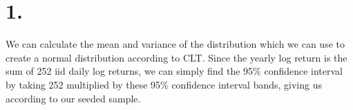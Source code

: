 \documentclass{article}
\begin{document}
\thispagestyle{firstpageheader}

\section*{1.}
{\Large 



We can calculate the mean and variance of the distribution which we can use to create a normal distribution according to CLT. Since the yearly log return is the sum of 252 iid daily log returns, we can simply find the 95\% confidence interval by taking 252 multiplied by these 95\% confidence interval bands, giving us  according to our seeded sample.

}
\end{document}
